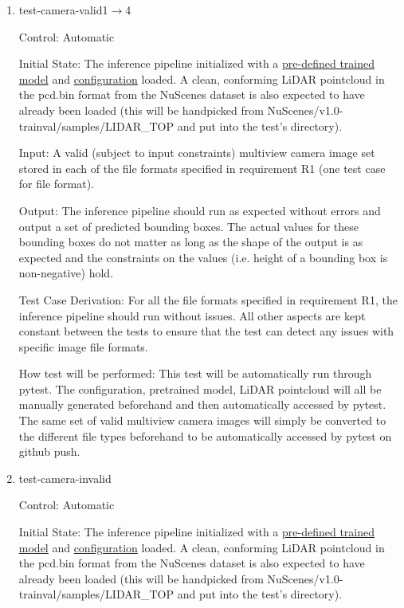 \documentclass[12pt, titlepage]{article}
\begin{document}
\begin{enumerate}

\item{test-camera-valid1$\rightarrow$4\\}

Control: Automatic
					
Initial State: The inference pipeline initialized with a \href{https://drive.google.com/file/d/1X50b-8immqlqD8VPAUkSKI0Ls-4k37g9/view}{pre-defined trained model} and \href{https://github.com/open-mmlab/OpenPCDet/blob/master/tools/cfgs/nuscenes_models/bevfusion.yaml}{configuration} loaded. A clean, conforming LiDAR pointcloud in the pcd.bin format
from the NuScenes dataset is also expected to have already been loaded (this will be handpicked from NuScenes/v1.0-trainval/samples/LIDAR\_TOP and put into the test's directory).
					
Input: A valid (subject to input constraints) multiview camera image set stored in each of the file formats specified in requirement R1 (one test case for file format).
					
Output: The inference pipeline should run as expected without errors and output a set of predicted bounding boxes. The actual values for these bounding boxes do not matter as long as the shape of the output is as expected and the constraints on the values (i.e. height of a bounding box is non-negative) hold.

Test Case Derivation: For all the file formats specified in requirement R1, the inference pipeline should run without issues. All other aspects are kept
constant between the tests to ensure that the test can detect any issues with specific image file formats.
					
How test will be performed: This test will be automatically run through pytest. The configuration, pretrained model, LiDAR pointcloud will all be manually generated beforehand
and then automatically accessed by pytest. The same set of valid multiview camera images will simply be converted to the different file types beforehand to be automatically accessed
by pytest on github push.
					
\item{test-camera-invalid\\}

Control: Automatic
					
Initial State: The inference pipeline initialized with a \href{https://drive.google.com/file/d/1X50b-8immqlqD8VPAUkSKI0Ls-4k37g9/view}{pre-defined trained model} and \href{https://github.com/open-mmlab/OpenPCDet/blob/master/tools/cfgs/nuscenes_models/bevfusion.yaml}{configuration} loaded. A clean, conforming LiDAR pointcloud in the pcd.bin format
from the NuScenes dataset is also expected to have already been loaded (this will be handpicked from NuScenes/v1.0-trainval/samples/LIDAR\_TOP and put into the test's directory).
					

\end{enumerate}
\end{document}
